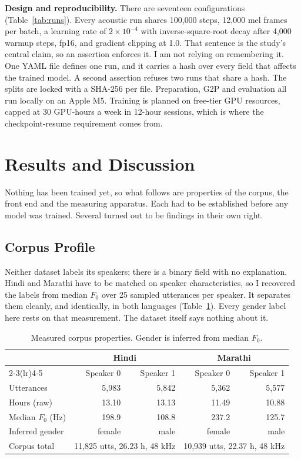 \documentclass[12pt,a4paper]{article}
\begin{document}
\textbf{Design and reproducibility.} There are seventeen configurations
(Table~\ref{tab:runs}). Every acoustic run shares 100{,}000 steps, 12{,}000 mel
frames per batch, a learning rate of $2\times10^{-4}$ with inverse-square-root
decay after 4{,}000 warmup steps, fp16, and gradient clipping at 1.0. That
sentence is the study's central claim, so an assertion enforces it. I am not
relying on remembering it. One YAML file defines one run, and it carries a hash
over every field that affects the trained model. A second assertion refuses two
runs that share a hash. The splits are locked with a SHA-256 per file.
Preparation, G2P and evaluation all run locally on an Apple M5. Training is
planned on free-tier GPU resources, capped at 30 GPU-hours a week in 12-hour
sessions, which is where the checkpoint-resume requirement comes from.

\section{Results and Discussion}

Nothing has been trained yet, so what follows are properties of the corpus, the
front end and the measuring apparatus. Each had to be established before any
model was trained. Several turned out to be findings in their own right.


\subsection{Corpus Profile}

Neither dataset labels its speakers; there is a binary field with no
explanation. Hindi and Marathi have to be matched on speaker
characteristics, so I recovered the labels from median $F_0$ over 25 sampled
utterances per speaker. It separates them cleanly, and identically, in both
languages (Table~\ref{tab:corpus}). Every gender label here rests on that
measurement. The dataset itself says nothing about it.

\begin{table}[htbp]
\centering\small
\caption{Measured corpus properties. Gender is inferred from median $F_0$.}
\label{tab:corpus}
\begin{tabular}{lrrrr}
\toprule
& \multicolumn{2}{c}{Hindi} & \multicolumn{2}{c}{Marathi} \\
\cmidrule(lr){2-3}\cmidrule(lr){4-5}
& Speaker 0 & Speaker 1 & Speaker 0 & Speaker 1 \\
\midrule
Utterances        & 5{,}983 & 5{,}842 & 5{,}362 & 5{,}577 \\
Hours (raw)       & 13.10 & 13.13 & 11.49 & 10.88 \\
Median $F_0$ (Hz) & 198.9 & 108.8 & 237.2 & 125.7 \\
Inferred gender   & female & male & female & male \\
\midrule
Corpus total & \multicolumn{2}{c}{11{,}825 utts, 26.23 h, 48 kHz} &
               \multicolumn{2}{c}{10{,}939 utts, 22.37 h, 48 kHz} \\
\bottomrule
\end{tabular}
\end{table}
\end{document}
